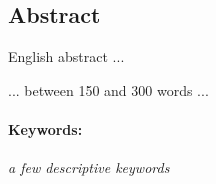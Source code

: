 \subsection*{Abstract}
English abstract ...

... between 150 and 300 words ...


\paragraph{Keywords:}
\textit{a few descriptive keywords}

